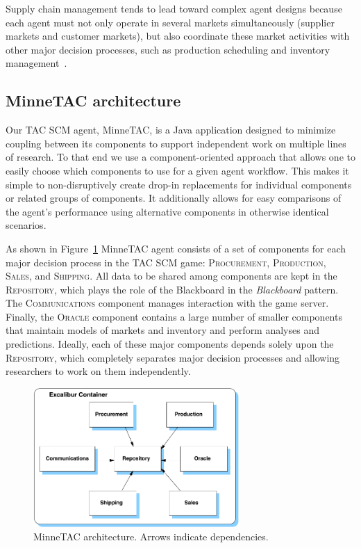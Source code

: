 \documentclass{article}
\begin{document}
Supply chain management tends to lead toward complex agent designs because each agent must not only operate in several markets simultaneously (supplier markets and customer markets), but also coordinate these market activities with other major decision processes, such as production scheduling and inventory management~\cite{Ketter08TADAbook}.

\subsection{MinneTAC architecture}

Our TAC SCM agent, MinneTAC, is a Java application designed to minimize coupling between its components to support independent work on multiple lines of research.
To that end we use a component-oriented approach that allows one to easily choose which components to use for a given agent workflow.
This makes it simple to non-disruptively create drop-in replacements for individual components or related groups of components.
It additionally allows for easy comparisons of the agent's performance using alternative components in otherwise identical scenarios.

As shown in Figure~\ref{fig:arch} MinneTAC agent consists of a set of components for each major decision process in the TAC SCM game:  \textsc{Procurement}, \textsc{Production}, \textsc{Sales}, and \textsc{Shipping}.
All data to be shared among components are kept in the \textsc{Repository}, which plays the role of the Blackboard in the \emph{Blackboard} pattern\cite{Busch96}.
The \textsc{Communications} component manages interaction with the game server.
Finally, the \textsc{Oracle} component contains a large number of smaller components that maintain models of markets and inventory and perform analyses and predictions.
Ideally, each of these major components depends solely upon the \textsc{Repository}, which completely separates major decision processes and allowing researchers to work on them independently.

\begin{figure}[ht]
\centering
\includegraphics[width=0.7\textwidth]{figures/arch}
\caption{\label{fig:arch}MinneTAC architecture.  Arrows indicate dependencies.}
\end{figure}
\end{document}
